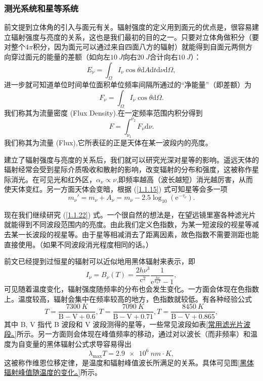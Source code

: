 \documentclass[../天体物理基础.tex]{subfiles}
\begin{document}
\subsubsection{测光系统和星等系统}
前文提到立体角的引入与面元有关。辐射强度的定义用到面元的优点是，很容易建立辐射强度与亮度的关系，这也是我们最初的目的之一。只要对立体角做积分（要对整个$4\pi$积分，因为面元可以通过来自四面八方的辐射）就能得到自面元两侧方向穿过面元的能量的差额（如向左$\qty{10}{J}$向右$\qty{20}{J}$合计向右$\qty{10}{J}$）：
\begin{equation}
E_{\nu}=\int_{\Omega}I_{\nu}\cos\theta\mathrm{d}A\mathrm{d}t\mathrm{d}\nu\mathrm{d}\Omega,
\end{equation}
进一步就可知道单位时间单位面积单位频率间隔所通过的“净能量”（即差额）为
\begin{equation}
F_{\nu}=\int_{\Omega}I_{\nu}\cos\theta\mathrm{d}\Omega.
\end{equation}
我们称其为流量密度 (Flux Density).在一定频率范围内积分得到
\begin{equation}
F=\int_{\nu_{1}}^{\nu_{2}}F_{\nu}\mathrm{d}\nu.\label{1.1.22}
\end{equation}
我们称其为流量 (Flux),它所表征的正是天体在某一波段内的亮度。

建立了辐射强度与亮度的关系后，我们就可以研究光深对星等的影响。遥远天体的辐射经常会受到星际介质吸收和散射的影响，改变辐射的分布和强度，这被称作星际消光。在可见光和红外区，$\alpha_{\nu}\propto{}\nu$,即频率越高（波长越短）消光越厉害，从而使天体变红。另一方面天体会变暗，根据 (\ref{1.1.15}) 式可知星等会多一项
\begin{equation}
m_{\nu}'=m_{\nu}+A_{\nu}=m_{\nu}-2.5\log_{10}\left(\mathrm{e}^{-\tau_{\nu}}\right).
\end{equation}

现在我们继续研究 (\ref{1.1.22}) 式。一个很自然的想法是，在望远镜里塞各种滤光片就能得到不同波段范围内的亮度。由此我们定义色指数，为某一短波段的视星等减去某一长波段的视星等。由于星等相减消去了距离因素，故色指数不需要测距也能直接使用。（如果不同波段消光程度相同的话。）

前文已经提到过恒星的辐射可以近似地用黑体辐射来表示，即
\begin{equation}
I_{\nu}=B_{\nu}\left(T\right)=\frac{2h\nu^{3}}{\mathrm{c}^{2}}\frac{1}{\mathrm{e}^{\frac{h\nu}{k_{\text{B}}T}}-1},
\end{equation}
可见随着温度变化，辐射强度随频率的分布也会发生变化。一方面会体现在色指数上。温度较高，辐射会集中在频率较高的地方，色指数就较低。有各种经验公式
\begin{equation}
T=\frac{\qty{7300}{K}}{\mathrm{B-V}+0.6},T=\frac{\qty{7090}{K}}{\mathrm{B-V}+0.71},T=\frac{\qty{8450}{K}}{\mathrm{B-V}+0.865},
\end{equation}
其中 B, V 指代 B 波段和 V 波段测得的星等，一些常见波段如表\ref{常用滤光片波段。}所示。另一方面则会体现在峰值频率的移动，通过对以波长（而非频率）和温度为自变量的黑体辐射公式求导容易得出
\begin{equation}
\lambda_{\max}T=\qty{2.9e6}{nm\cdot K},
\end{equation}
这被称作维恩位移定律，是温度和辐射峰值波长所满足的关系。具体可见图\ref{黑体辐射峰值随温度的变化。}所示。
\end{document}
